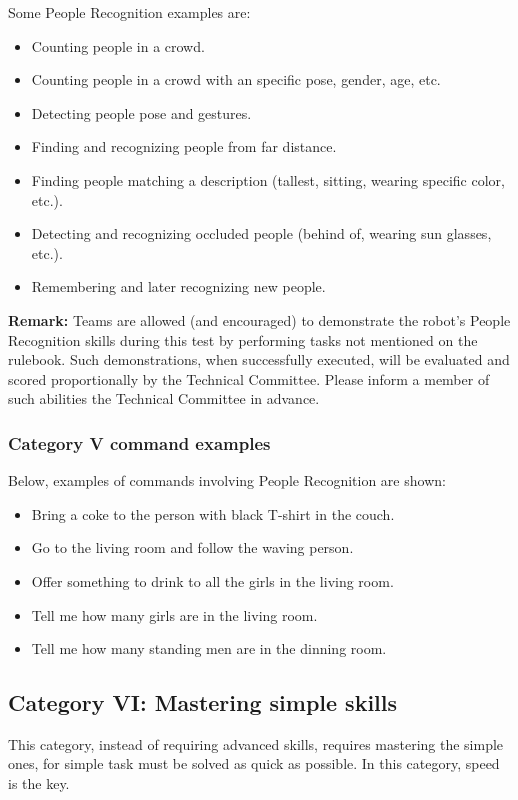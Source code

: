 Some People Recognition examples are:
\begin{itemize}
	\item Counting people in a crowd.
	\item Counting people in a crowd with an specific pose, gender, age, etc.
	\item Detecting people pose and gestures.
	\item Finding and recognizing people from far distance.
	\item Finding people matching a description (tallest, sitting, wearing specific color, etc.).
	\item Detecting and recognizing occluded people (behind of, wearing sun glasses, etc.).
	\item Remembering and later recognizing new people.
\end{itemize}

\textbf{Remark:} Teams are allowed (and encouraged) to demonstrate the robot's People Recognition skills during this test by performing tasks not mentioned on the rulebook. Such demonstrations, when successfully executed, will be evaluated and scored proportionally by the Technical Committee. Please inform a member of such abilities the Technical Committee in advance.

\subsubsection{Category V command examples}
Below, examples of commands involving People Recognition are shown:
\begin{itemize}
	\item Bring a coke to the person with black T-shirt in the couch.
	\item Go to the living room and follow the waving person.
	\item Offer something to drink to all the girls in the living room.
	\item Tell me how many girls are in the living room.
	\item Tell me how many standing men are in the dinning room.
\end{itemize}


%
%
\subsection{Category VI: Mastering simple skills}
\label{sec:eegpsr-categoryVI-explained}
This category, instead of requiring advanced skills, requires mastering the simple ones, for simple task must be solved as quick as possible. In this category, speed is the key.

